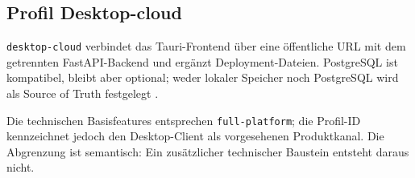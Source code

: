 \subsection{Profil Desktop-cloud}
\label{subsec:profil-desktop-cloud}

\texttt{desktop-cloud} verbindet das Tauri-Frontend über eine öffentliche URL
mit dem getrennten FastAPI-Backend und ergänzt Deployment-Dateien. PostgreSQL
ist kompatibel, bleibt aber optional; weder lokaler Speicher noch PostgreSQL
wird als Source of Truth festgelegt
\parencite{kleiveist2026profiles,kleiveist2026deployment,kleiveist2026persistence}.

Die technischen Basisfeatures entsprechen \texttt{full-platform}; die
Profil-ID kennzeichnet jedoch den Desktop-Client als vorgesehenen Produktkanal.
Die Abgrenzung ist semantisch: Ein zusätzlicher technischer Baustein entsteht
daraus nicht.
